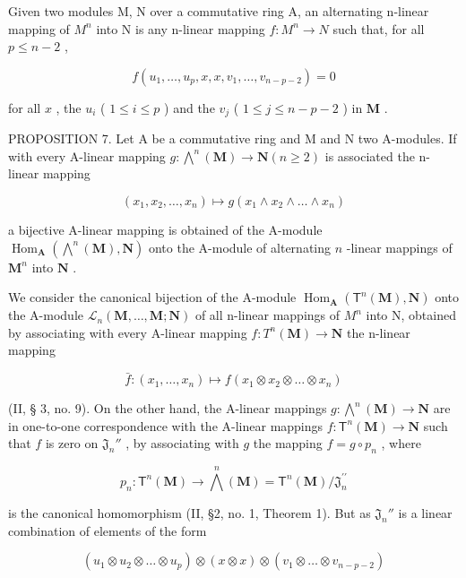 Given two modules M, N over a commutative ring A, an alternating n-linear mapping of \(M^{n}\) into N is any n-linear mapping \(f: M^{n} \to N\) such that, for all \(p \leqslant n - 2\) ,

\[
f (u _ {1}, \dots , u _ {p}, x, x, v _ {1}, \dots , v _ {n - p - 2}) = 0\tag{8}
\]

for all \(x\) , the \(u_{i}\) ( \(1 \leqslant i \leqslant p\) ) and the \(v_{j}\) ( \(1 \leqslant j \leqslant n - p - 2\) ) in \(\mathbf{M}\) .

PROPOSITION 7. Let A be a commutative ring and M and N two A-modules. If with every A-linear mapping \(g: \bigwedge^n (\mathbf{M}) \to \mathbf{N} (n \geqslant 2)\) is associated the n-linear mapping

\[
\left(x _ {1}, x _ {2}, \dots , x _ {n}\right) \mapsto g \left(x _ {1} \wedge x _ {2} \wedge \dots \wedge x _ {n}\right)\tag{9}
\]

a bijective A-linear mapping is obtained of the A-module \(\operatorname{Hom}_{\mathbf{A}}(\bigwedge^{n}(\mathbf{M}), \mathbf{N})\) onto the A-module of alternating \(n\) -linear mappings of \(\mathbf{M}^n\) into \(\mathbf{N}\) .

We consider the canonical bijection of the A-module \(\operatorname{Hom}_{\mathbf{A}}(\mathsf{T}^{n}(\mathbf{M}),\mathbf{N})\) onto the A-module \(\mathcal{L}_{n}(\mathbf{M},\ldots,\mathbf{M};\mathbf{N})\) of all n-linear mappings of \(M^{n}\) into N, obtained by associating with every A-linear mapping \(f: T^{n}(\mathbf{M}) \to \mathbf{N}\) the n-linear mapping

\[
\bar {f} \colon (x _ {1}, \dots , x _ {n}) \mapsto f (x _ {1} \otimes x _ {2} \otimes \dots \otimes x _ {n})
\]

(II, § 3, no. 9). On the other hand, the A-linear mappings \(g \colon \bigwedge^{n}(\mathbf{M}) \to \mathbf{N}\) are in one-to-one correspondence with the A-linear mappings \(f \colon \mathsf{T}^n (\mathbf{M}) \to \mathbf{N}\) such that \(f\) is zero on \(\mathfrak{J}_n''\) , by associating with \(g\) the mapping \(f = g \circ p_n\) , where

\[
p _ {n} \colon \mathsf {T} ^ {n} (\mathbf {M}) \rightarrow \bigwedge^ {n} (\mathbf {M}) = \mathsf {T} ^ {n} (\mathbf {M}) / \mathfrak {J} _ {n} ^ {\prime \prime}
\]

is the canonical homomorphism (II, §2, no. 1, Theorem 1). But as \(\mathfrak{J}_n''\) is a linear combination of elements of the form

\[
\left(u _ {1} \otimes u _ {2} \otimes \dots \otimes u _ {p}\right) \otimes (x \otimes x) \otimes \left(v _ {1} \otimes \dots \otimes v _ {n - p - 2}\right)
\]

